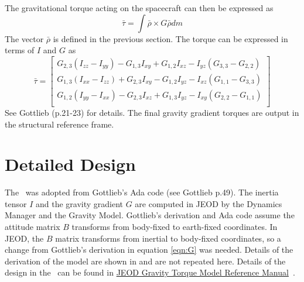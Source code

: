 The gravitational torque acting on the spacecraft can then be expressed as\cite{JSC23762}
\begin{equation}
\bar{\tau} = \int \bar{\rho}\times G \bar{\rho} dm
\end{equation}
The vector $\bar{\rho}$ is defined in the previous section.
The torque can be expressed in terms of $I$ and $G$ as
\begin{equation}
\bar{\tau} = \left[
\begin{array}{c}
G_{2,3}(I_{zz}-I_{yy}) - G_{1,3}I_{xy} + G_{1,2}I_{xz} - I_{yz}(G_{3,3}-G_{2,2}) \\
G_{1,3}(I_{xx}-I_{zz}) + G_{2,3}I_{xy} - G_{1,2}I_{yz} - I_{xz}(G_{1,1}-G_{3,3}) \\
G_{1,2}(I_{yy}-I_{xx}) - G_{2,3}I_{xz} + G_{1,3}I_{yz} - I_{xy}(G_{2,2}-G_{1,1}) \\
\end{array}
\right]
\end{equation}
See Gottlieb\cite{JSC23762} (p.21-23) for details.
The final gravity gradient torques are output in the structural reference frame.

\section{Detailed Design}
The \gravitytorqueDesc\ was adopted from Gottlieb's Ada
code (see Gottlieb\cite{JSC23762} p.49).  The inertia tensor $I$ and the 
gravity gradient $G$ are computed in JEOD by the Dynamics Manager
and the Gravity Model.
Gottlieb's derivation and Ada code assume the attitude matrix $B$ transforms
from body-fixed to earth-fixed coordinates.  In JEOD, the $B$ matrix transforms
from inertial to body-fixed coordinates, so a change from Gottlieb's derivation
in equation \ref{eqn:G} was needed.  Details of the derivation
of the model are shown in \cite{JSC23762} and are not repeated here.
Details of the design in the \gravitytorqueDesc\ can be found in
\href{file:refman.pdf}
{JEOD Gravity Torque Model Reference Manual}~\cite{gravtorq_refman}.

